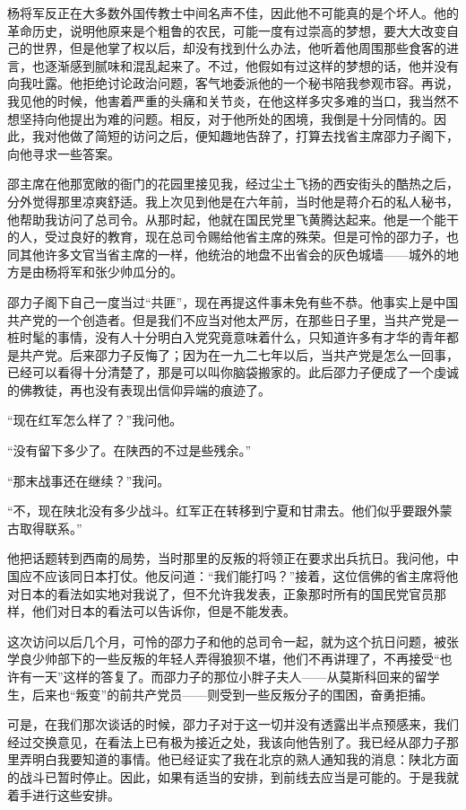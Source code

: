 \documentclass[10pt]{book}
\begin{document}
杨将军反正在大多数外国传教士中间名声不佳，因此他不可能真的是个坏人。他的革命历史，说明他原来是个粗鲁的农民，可能一度有过崇高的梦想，要大大改变自己的世界，但是他掌了权以后，却没有找到什么办法，他听着他周围那些食客的进言，也逐渐感到腻味和混乱起来了。不过，他假如有过这样的梦想的话，他并没有向我吐露。他拒绝讨论政治问题，客气地委派他的一个秘书陪我参观市容。再说，我见他的时候，他害着严重的头痛和关节炎，在他这样多灾多难的当口，我当然不想坚持向他提出为难的问题。相反，对于他所处的困境，我倒是十分同情的。因此，我对他做了简短的访问之后，便知趣地告辞了，打算去找省主席邵力子阁下，向他寻求一些答案。

邵主席在他那宽敞的衙门的花园里接见我，经过尘土飞扬的西安街头的酷热之后，分外觉得那里凉爽舒适。我上次见到他是在六年前，当时他是蒋介石的私人秘书，他帮助我访问了总司令。从那时起，他就在国民党里飞黄腾达起来。他是一个能干的人，受过良好的教育，现在总司令赐给他省主席的殊荣。但是可怜的邵力子，也同其他许多文官当省主席的一样，他统治的地盘不出省会的灰色城墙——城外的地方是由杨将军和张少帅瓜分的。

邵力子阁下自己一度当过“共匪”，现在再提这件事未免有些不恭。他事实上是中国共产党的一个创造者。但是我们不应当对他太严厉，在那些日子里，当共产党是一桩时髦的事情，没有人十分明白入党究竟意味着什么，只知道许多有才华的青年都是共产党。后来邵力子反悔了；因为在一九二七年以后，当共产党是怎么一回事，已经可以看得十分清楚了，那是可以叫你脑袋搬家的。此后邵力子便成了一个虔诚的佛教徒，再也没有表现出信仰异端的痕迹了。

“现在红军怎么样了？”我问他。

“没有留下多少了。在陕西的不过是些残余。”

“那末战事还在继续？”我问。

“不，现在陕北没有多少战斗。红军正在转移到宁夏和甘肃去。他们似乎要跟外蒙古取得联系。”

他把话题转到西南的局势，当时那里的反叛的将领正在要求出兵抗日。我问他，中国应不应该同日本打仗。他反问道：“我们能打吗？”接着，这位信佛的省主席将他对日本的看法如实地对我说了，但不允许我发表，正象那时所有的国民党官员那样，他们对日本的看法可以告诉你，但是不能发表。

这次访问以后几个月，可怜的邵力子和他的总司令一起，就为这个抗日问题，被张学良少帅部下的一些反叛的年轻人弄得狼狈不堪，他们不再讲理了，不再接受“也许有一天”这样的答复了。而邵力子的那位小胖子夫人——从莫斯科回来的留学生，后来也“叛变”的前共产党员——则受到一些反叛分子的围困，奋勇拒捕。

可是，在我们那次谈话的时候，邵力子对于这一切并没有透露出半点预感来，我们经过交换意见，在看法上已有极为接近之处，我该向他告别了。我已经从邵力子那里弄明白我要知道的事情。他已经证实了我在北京的熟人通知我的消息：陕北方面的战斗已暂时停止。因此，如果有适当的安排，到前线去应当是可能的。于是我就着手进行这些安排。
\end{document}
